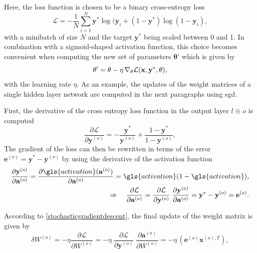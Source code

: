Here, the loss function is chosen to be a binary cross-entropy loss
\begin{equation*}
\mathcal{L} = - \frac{1}{N} \sum_{i=1}^N \textbf{y}^* \log(\textbf{y}_i + (1-\textbf{y}^*) \log(1 - \textbf{y}_i), 
\end{equation*}
with a minibatch of size $N$ and the target $\textbf{y}^*$ being scaled between 0 and 1. In combination with a sigmoid-shaped activation function, this choice becomes convenient when computing the new set of parameters $\mathbf{\theta}'$ which is given by
\begin{equation}
\mathbf{\theta'} = \mathbf{\theta} - \eta \, \nabla_\theta\mathcal{L}(\mathbf{\mathbf{x}, y^*, \mathbf{\theta}}),
\label{stochasticgradientdescent}
\end{equation}
with the learning rate $\eta$. As an example, the updates of the weight matrices of a single hidden layer network are computed in the next paragraphs using \gls{sgd}. 

First, the derivative of the cross entropy loss function in the output layer $l\equiv o$ is computed
\begin{equation*}
\frac{\partial\mathcal{L}}{\partial \mathbf{y}^{(o)}} = 
- \frac{\mathbf{y}^*}{\mathbf{y}^{(o)}} + 
\frac{1 - \mathbf{y}^*}{1 - \mathbf{y}^{(o)}},
\end{equation*}
The gradient of the loss can then be rewritten in terms of the error $\mathbf{e}^{(o)} = \mathbf{y}^* - \mathbf{y}^{(o)}$ by using the derivative of the activation function
\begin{align*}
\frac{\partial \mathbf{y}^{(o)}}{\partial \mathbf{a}^{(o)}} = \frac{\partial \gls{activation}(\mathbf{a}^{(o)})}{\partial \mathbf{a}^{(o)}} = \gls{activation} (1 - \gls{activation}),\\
\Rightarrow \quad \frac{\partial\mathcal{L}}{\partial \mathbf{a}^{(o)}} =
\frac{\partial\mathcal{L}}{\partial \mathbf{y}^{(o)}} 
\; \frac{\partial \mathbf{y}^{(o)}}{\partial \mathbf{a}^{(o)}} =
\mathbf{y}^* - \mathbf{y}^{(o)} = \mathbf{e}^{(o)}.
\end{align*}

According to \cref{stochasticgradientdescent}, the final update of the weight matrix is given by
\begin{equation}
\delta W^{(o)} = - \eta \frac{\partial \mathcal{L}}{\partial W^{(o)}} 
= - \eta \;
\frac{\partial\mathcal{L}}{\partial \mathbf{y}^{(o)}} \;
\frac{\partial \mathbf{a}^{(o)}}{\partial W^{(o)}}
= - \eta \, \left(\mathbf{e}^{(o)} \mathbf{x}^{(o),T}\right),
\label{backpropupdate}
\end{equation}

